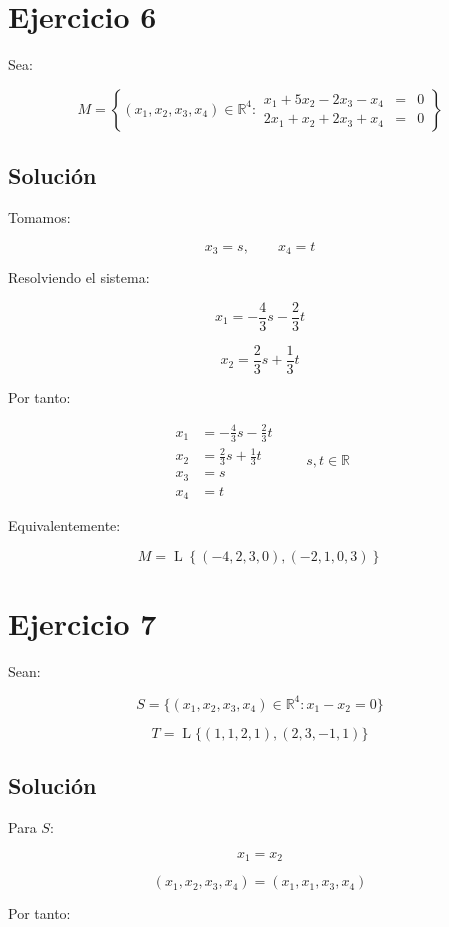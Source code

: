 \documentclass[11pt,a4paper]{article}
\newcommand{\R}{\mathbb{R}}
\newcommand{\Span}{\operatorname{L}}
\begin{document}
\section{Ejercicio 6}
	Sea:

	\[
	M=
	\left\{
	(x_1,x_2,x_3,x_4)\in\R^4:
	\begin{array}{rcl}
	x_1+5x_2-2x_3-x_4&=&0\\
	2x_1+x_2+2x_3+x_4&=&0
	\end{array}
	\right\}
	\]

	\subsection{Solución}

	Tomamos:

	\[
	x_3=s,
	\qquad
	x_4=t
	\]

	Resolviendo el sistema:

	\[
	x_1
	=
	-\frac{4}{3}s
	-\frac{2}{3}t
	\]

	\[
	x_2
	=
	\frac{2}{3}s
	+\frac{1}{3}t
	\]

	Por tanto:

	\[
	\boxed{
	\begin{aligned}
	x_1&=-\frac{4}{3}s-\frac{2}{3}t\\
	x_2&=\frac{2}{3}s+\frac{1}{3}t\\
	x_3&=s\\
	x_4&=t
	\end{aligned}
	\qquad s,t\in\R
	}
	\]

	Equivalentemente:

	\[
	M=
	\Span\left\{
	(-4,2,3,0),
	(-2,1,0,3)
	\right\}
	\]

\section{Ejercicio 7}
	Sean:

	\[
	S=
	\{(x_1,x_2,x_3,x_4)\in\R^4:x_1-x_2=0\}
	\]

	\[
	T=
	\Span\{(1,1,2,1),(2,3,-1,1)\}
	\]

	\subsection{Solución}

	Para $S$:

	\[
	x_1=x_2
	\]

	\[
	(x_1,x_2,x_3,x_4)
	=
	(x_1,x_1,x_3,x_4)
	\]

	Por tanto:
\end{document}
